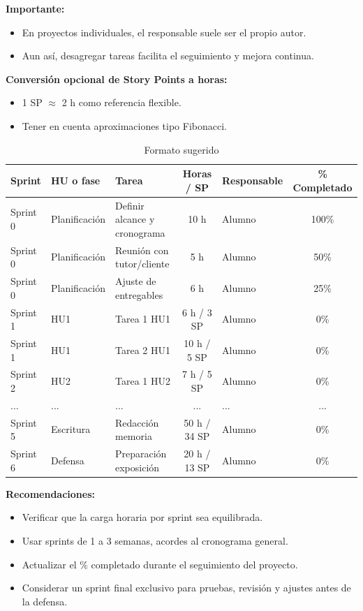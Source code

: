 \documentclass[
11pt, %
]{charter}
\begin{document}
\textbf{Importante:}
\begin{itemize}
  \item En proyectos individuales, el responsable suele ser el propio autor.
  \item Aun así, desagregar tareas facilita el seguimiento y mejora continua.
\end{itemize}

\textbf{Conversión opcional de Story Points a horas:}
\begin{itemize}
  \item 1 SP \(\approx\) 2 h como referencia flexible.
  \item Tener en cuenta aproximaciones tipo Fibonacci.
\end{itemize}

\begin{table}[htpb]
\centering
\caption{Formato sugerido}
\begin{tabularx}{\linewidth}{@{}|l|l|X|c|l|c|@{}}
\hline
\rowcolor[HTML]{C0C0C0}
Sprint & HU o fase & Tarea & Horas / SP & Responsable & \% Completado \\ \hline
Sprint 0 & Planificación & Definir alcance y cronograma & 10 h & Alumno & 100\% \\ \hline
Sprint 0 & Planificación & Reunión con tutor/cliente & 5 h & Alumno & 50\% \\ \hline
Sprint 0 & Planificación & Ajuste de entregables & 6 h & Alumno & 25\% \\ \hline
Sprint 1 & HU1 & Tarea 1 HU1 & 6 h / 3 SP & Alumno & 0\% \\ \hline
Sprint 1 & HU1 & Tarea 2 HU1 & 10 h / 5 SP & Alumno & 0\% \\ \hline
Sprint 2 & HU2 & Tarea 1 HU2 & 7 h / 5 SP & Alumno & 0\% \\ \hline
... & ... & ... & ... & ... & ... \\ \hline
Sprint 5 & Escritura & Redacción memoria & 50 h / 34 SP & Alumno & 0\% \\ \hline
Sprint 6 & Defensa & Preparación exposición & 20 h / 13 SP & Alumno & 0\% \\ \hline
\end{tabularx}
\end{table}

\textbf{Recomendaciones:}
\begin{itemize}
  \item Verificar que la carga horaria por sprint sea equilibrada.
  \item Usar sprints de 1 a 3 semanas, acordes al cronograma general.
  \item Actualizar el \% completado durante el seguimiento del proyecto.
  \item Considerar un sprint final exclusivo para pruebas, revisión y ajustes antes de la defensa.
\end{itemize}
\end{document}
